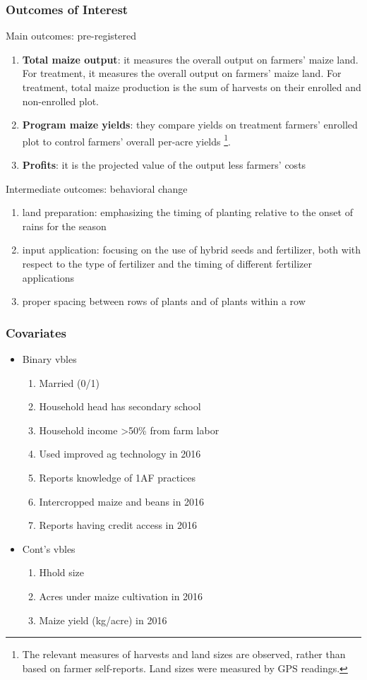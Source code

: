 \documentclass[12pt,letterpaper]{article}
\begin{document}
\subsubsection*{Outcomes of Interest}
\noindent Main outcomes: pre-registered
\begin{enumerate}
	\item \textbf{Total maize output}: it measures the overall output on farmers’ maize land. For treatment, it measures the overall output on farmers’ maize land. For treatment, total maize production is the sum of harvests on their enrolled and non-enrolled plot.
	\item \textbf{Program maize yields}: they compare yields on treatment farmers’ enrolled plot to control farmers’ overall per-acre yields \footnote{The relevant measures of harvests and land sizes are observed, rather than based on farmer self-reports. Land sizes were measured by GPS readings.}.
	\item \textbf{Profits}: it is the projected value of the output less farmers’ costs
\end{enumerate}

\noindent Intermediate outcomes: behavioral change
\begin{enumerate}
  \item land preparation: emphasizing the timing of planting relative to the onset of rains for the season
  \item input application: focusing on the use of hybrid seeds and fertilizer, both with respect to the type of fertilizer and the timing of different fertilizer applications
  \item proper spacing between rows of plants and of plants within a row
\end{enumerate}

\subsubsection*{Covariates}
\begin{itemize}
  \item Binary vbles
    \begin{enumerate}
      \item Married (0/1)
      \item Household head has secondary school
      \item Household income >50\% from farm labor
      \item Used improved ag technology in 2016
      \item Reports knowledge of 1AF practices
      \item Intercropped maize and beans in 2016
      \item Reports having credit access in 2016
    \end{enumerate}
  \item Cont's vbles
    \begin{enumerate}
      \item Hhold size
      \item Acres under maize cultivation in 2016
      \item Maize yield (kg/acre) in 2016
    \end{enumerate}
 \end{itemize}
 
\end{document}
